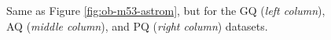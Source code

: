 \documentclass[]{spie}  %
\begin{document}
\begin{figure}[!h]
  \hspace{-1.5cm}
  \caption{\footnotesize Same as Figure \ref{fig:ob-m53-astrom}, but for the GQ (\textit{left column}), AQ (\textit{middle column}), and PQ (\textit{right column}) datasets.} \label{fig:gc-astrom}
\end{figure}
\end{document}
